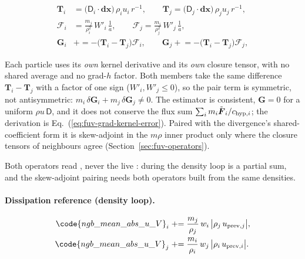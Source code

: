 \begin{align}
  \boldsymbol{T}_i &= \big(\mathsf{D}_i\!\cdot\!\boldsymbol{dx}\big)\,\rho_i u_i\, r^{-1},
  \qquad
  \boldsymbol{T}_j = \big(\mathsf{D}_j\!\cdot\!\boldsymbol{dx}\big)\,\rho_j u_j\, r^{-1},
  \label{eq:isrfd-grad-temp} \\
  \mathcal{F}_i &= \frac{m_j}{\rho_i^2}\,W'_i\,\frac{1}{a},
  \qquad
  \mathcal{F}_j = \frac{m_i}{\rho_j^2}\,W'_j\,\frac{1}{a},
  \label{eq:isrfd-grad-fac} \\
  \boldsymbol{G}_i &\mathrel{+}= -\big(\boldsymbol{T}_i - \boldsymbol{T}_j\big)\mathcal{F}_i,
  \qquad
  \boldsymbol{G}_j \mathrel{+}= -\big(\boldsymbol{T}_i - \boldsymbol{T}_j\big)\mathcal{F}_j,
  \label{eq:isrfd-grad-apply}
\end{align}

Each particle uses its \emph{own} kernel derivative and its
\emph{own} closure tensor, with no shared average and no grad-$h$ 
factor. Both members take the same difference
$\boldsymbol{T}_i - \boldsymbol{T}_j$ with a factor of one sign
($W'_i, W'_j \le 0$), so the pair term is symmetric, not antisymmetric:
$m_i\,\delta\boldsymbol{G}_i + m_j\,\delta\boldsymbol{G}_j \ne 0$. The
estimator is consistent, $\boldsymbol{G} = 0$ for a uniform
$\rho u\,\mathsf{D}$, and it does not conserve the flux sum
$\sum_i m_i\tilde{\boldsymbol{F}}_i/c_{{\rm hyp},i}$; the derivation is
Eq.~(\ref{eq:fuv-grad-kernel-error}). Paired with the divergence's
shared-coefficient form it is skew-adjoint in the $m\rho$ inner product
only where the closure tensors of neighbours agree
(Section~\ref{sec:fuv-operators}).

Both operators read , never the live : during the
density loop  is a partial sum, and the
skew-adjoint pairing needs both operators built from the same densities.

\paragraph{Dissipation reference (density loop).}

\begin{align}
  \code{ngb\_mean\_abs\_u\_V}_i &\mathrel{+}= \frac{m_j}{\rho_j}\, w_i\,
    \big|\rho_j\, u_{{\rm prev},j}\big|,
  \label{eq:isrfd-diss-ref-i} \\
  \code{ngb\_mean\_abs\_u\_V}_j &\mathrel{+}= \frac{m_i}{\rho_i}\, w_j\,
    \big|\rho_i\, u_{{\rm prev},i}\big| .
  \label{eq:isrfd-diss-ref-j}
\end{align}

